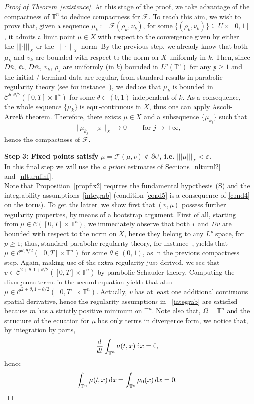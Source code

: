 \documentclass[10pt,a4paper,nouppercase,nowrite]{article}
\numberwithin{equation}{section}
\newcommand{\di}{{\rm d}}
\newcommand{\Sp}{{\textsc (S)} }
\newcommand{\eps}{\varepsilon}
\newcommand{\T}{\mathbb{T}}
\newcommand{\triplenorm}[1]{%
	\left\lvert\!\left\lvert\!\left\lvert #1
	\right\rvert\!\right\rvert\!\right\rvert}
\theoremstyle{definition}
\begin{document}
\begin{proof}[Proof of Theorem~\ref{existence}]
At this stage of the proof, we take advantage of the compactness of $\T^n$ to deduce compactness for $\mathcal{F}$. To reach this aim, we wish to prove that, given a sequence $\mu_k:=\mathcal{F}(\rho_k,\nu_k)$, for some $\{ (\rho_k,\nu_k) \} \subseteq U \times [0,1]$, it admits a limit point $\mu \in X$ with respect to the convergence given by either the $\triplenorm{\cdot}_X$ or the $\|\cdot\|_X$ norm. 
By the previous step, we already know that both $\mu_k$ and $v_k$ are bounded with respect to the norm on $X$ uniformly in $k$. 
Then, since $D \bar u$, $\bar m$, $ D \bar m$, $v_k$, $\rho_k$ are uniformly (in $k$) bounded in $L^{p}(\T^n)$ for any $p \geq 1$ and the initial / terminal data are regular, from standard results in parabolic regularity theory (see for instance~\cite{LSU68}), we deduce that $\mu_k$ is bounded in $\mathcal{C}^{\theta,\theta / 2} ([0,T] \times \T^n)$ for some $\theta \in (0,1)$ independent of $k$.
As a consequence, the whole sequence $\{ \mu_k \}$ is equi-continuous in $X$, thus one can apply Ascoli-Arzelà theorem. Therefore, there exists $\mu \in X$ and a subsequence $\{ \mu_{k_j} \}$ such that 
$$\|\mu_{k_j}-\mu\|_X \to 0 \qquad \text{ for } j \to +\infty,$$
hence the compactness of $\mathcal{F}$.

\medskip

\textbf{Step 3: Fixed points satisfy $\mu=\mathcal{F}(\mu,\nu) \not \in \partial U$, i.e. $\triplenorm{\mu}_X < \bar \eps$.} \\
In this final step we will use the \textit{a priori} estimates of Sections~\ref{nlturnl2} and~\ref{nlturnlinf}. \\
Note that Proposition~\ref{propfix2} requires the fundamental hypothesis~\Sp and the integrability assumptions~\eqref{integrab} (condition \eqref{cond5} is a consequence of \eqref{cond4} on the torus). To get the latter, we show first that $(v,\mu)$ possess further regularity properties, by means of a bootstrap argument. First of all, starting from \mbox{$\mu \in \mathcal{C}([0,T] \times \T^n)$}, we immediately observe that both $v$ and $Dv$ are bounded with respect to the norm on $X$, hence they belong to any $L^p$ space, for $p \ge 1$; thus, standard parabolic regularity theory, for instance~\cite{LSU68,Lieb}, yields that \mbox{$\mu \in \mathcal{C}^{\theta,\theta / 2}([0,T] \times \T^n)$} for some $\theta \in (0,1)$, as in the previous compactness step. Again, making use of the extra regularity just derived, we see that \mbox{$v \in \mathcal{C}^{2+\theta,1+\theta / 2}([0,T] \times \T^n)$} by parabolic Schauder theory. Computing the divergence terms in the second equation yields that also \mbox{$\mu \in \mathcal{C}^{2+\theta,1+\theta / 2}([0,T] \times \T^n)$}. Actually, $v$ has at least one additional continuous spatial derivative, hence the regularity assumptions in ~\eqref{integrab} are satisfied because $\bar m$ has a strictly positive minimum on $\T^n$. Note also that, $\Omega=\T^n$ and the structure of the equation for $\mu$ has only terms in divergence form, we notice that, by integration by parts,
$$\frac{d}{dt} \int_{\T^n} \mu(t,x) \, \di x = 0,$$
hence
$$\int_{\T^n} \mu(t,x)\, \di x = \int_{\T^n} \mu_0(x) \, \di x = 0.$$



\end{proof}
\end{document}
